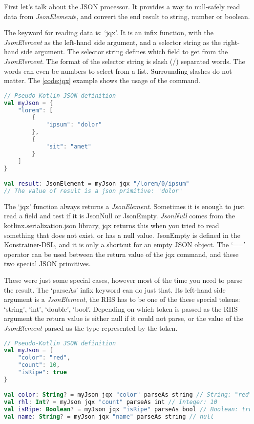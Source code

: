 First let's talk about the JSON processor. It provides a way to null-safely read data from \emph{JsonElement}s, and convert the end result to string, number or boolean. 

The keyword for reading data is: `jqx'. It is an infix function, with the \emph{JsonElement} as the left-hand side argument, and a selector string as the right-hand side argument. The selector string defines which field to get from the \emph{JsonElement}. The format of the selector string is slash (/) separated words. The words can even be numbers to select from a list. Surrounding slashes do not matter. The \ref{code:jqx} example shows the usage of the command.

\begin{lstlisting}[caption={Usage of `jqx'},language=Kotlin,label=code:jqx]
// Pseudo-Kotlin JSON definition
val myJson = {
    "lorem": [
        {
            "ipsum": "dolor"
        },
        {
            "sit": "amet"
        }
    ]
}

val result: JsonElement = myJson jqx "/lorem/0/ipsum"
// The value of result is a json primitive: "dolor"
\end{lstlisting}

The `jqx' function always returns a \emph{JsonElement}. Sometimes it is enough to just read a field and test if it is JsonNull or JsonEmpty. \emph{JsonNull} comes from the kotlinx.serialization.json library, jqx returns this when you tried to read something that does not exist, or has a null value. JsonEmpty is defined in the Konstrainer-DSL, and it is only a shortcut for an empty JSON object. The `==' operator can be used between the return value of the jqx command, and these two special JSON primitives.

These were just some special cases, however most of the time you need to parse the result. The `parseAs' infix keyword can do just that. Its left-hand side argument is a \emph{JsonElement}, the RHS has to be one of the these special tokens: `string', `int', `double', `bool'. Depending on which token is passed as the RHS argument the return value is either null if it could not parse, or the value of the \emph{JsonElement} parsed as the type represented by the token.

\begin{lstlisting}[caption={Usage of `parseAs'},language=Kotlin,label=code:jqx2]
// Pseudo-Kotlin JSON definition
val myJson = {
    "color": "red",
    "count": 10,
    "isRipe": true
}

val color: String? = myJson jqx "color" parseAs string // String: "red"
val rhl: Int? = myJson jqx "count" parseAs int // Integer: 10
val isRipe: Boolean? = myJson jqx "isRipe" parseAs bool // Boolean: true
val name: String? = myJson jqx "name" parseAs string // null
\end{lstlisting}

